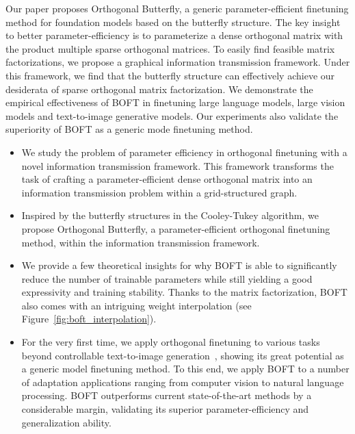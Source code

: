 Our paper proposes Orthogonal Butterfly, a generic parameter-efficient finetuning method for foundation models based on the butterfly structure. The key insight to better parameter-efficiency is to parameterize a dense orthogonal matrix with the product multiple sparse orthogonal matrices. To easily find feasible matrix factorizations, we propose a graphical information transmission framework. Under this framework, we find that the butterfly structure can effectively achieve our desiderata of sparse orthogonal matrix factorization. We demonstrate the empirical effectiveness of BOFT in finetuning large language models, large vision models and text-to-image generative models. Our experiments also validate the superiority of BOFT as a generic mode finetuning method.

\begin{itemize}[leftmargin=*,nosep]
    \item We study the problem of parameter efficiency in orthogonal finetuning with a novel information transmission framework. This framework transforms the task of crafting a parameter-efficient dense orthogonal matrix into an information transmission problem within a grid-structured graph.
    \item Inspired by the butterfly structures in the Cooley-Tukey algorithm, we propose Orthogonal Butterfly, a parameter-efficient orthogonal finetuning method, within the information transmission framework.
    \item We provide a few theoretical insights for why BOFT is able to significantly reduce the number of trainable parameters while still yielding a good expressivity and training stability. Thanks to the matrix factorization, BOFT also comes with an intriguing weight interpolation (see Figure~\ref{fig:boft_interpolation}).
    \item For the very first time, we apply orthogonal finetuning to various tasks beyond controllable text-to-image generation~\cite{qiu2023controlling}, showing its great potential as a generic model finetuning method. To this end, we apply BOFT to a number of adaptation applications ranging from computer vision to natural language processing. BOFT outperforms current state-of-the-art methods by a considerable margin, validating its superior parameter-efficiency and generalization ability.
\end{itemize}


